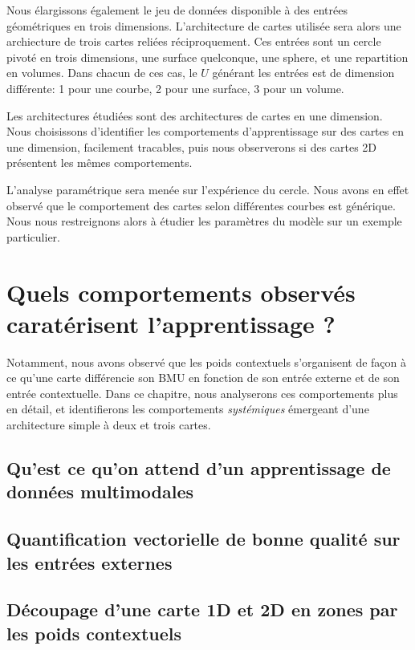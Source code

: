 Nous élargissons également le jeu de données disponible à des entrées géométriques en trois dimensions. L'architecture de cartes utilisée sera alors une archiecture de trois cartes reliées réciproquement.
Ces entrées sont un cercle pivoté en trois dimensions, une surface quelconque, une sphere, et une repartition en volumes. Dans chacun de ces cas, le $U$ générant les entrées est de dimension différente: 1 pour une courbe,  2 pour une surface, 3 pour un volume.

Les architectures étudiées sont des architectures de cartes en une dimension. Nous choisissons d'identifier les comportements d'apprentissage sur des cartes en une dimension, facilement tracables, puis nous observerons si des cartes 2D présentent les mêmes comportements.

L'analyse paramétrique sera menée sur l'expérience du cercle. Nous avons en effet observé que le comportement des cartes selon différentes courbes est générique. Nous nous restreignons alors à étudier les paramètres du modèle sur un exemple particulier.

\section{Quels comportements observés caratérisent l'apprentissage ?}

Notamment, nous avons observé que les poids contextuels s'organisent de façon à ce qu'une carte différencie son BMU en fonction de son entrée externe et de son entrée contextuelle. 
Dans ce chapitre, nous analyserons ces comportements plus en détail, et identifierons les comportements \emph{systémiques} émergeant d'une architecture simple à deux et trois cartes.

\subsection{Qu'est ce qu'on attend d'un apprentissage de données multimodales}

\subsection{Quantification vectorielle de bonne qualité sur les entrées externes}

\subsection{Découpage d'une carte 1D et 2D en zones par les poids contextuels}

